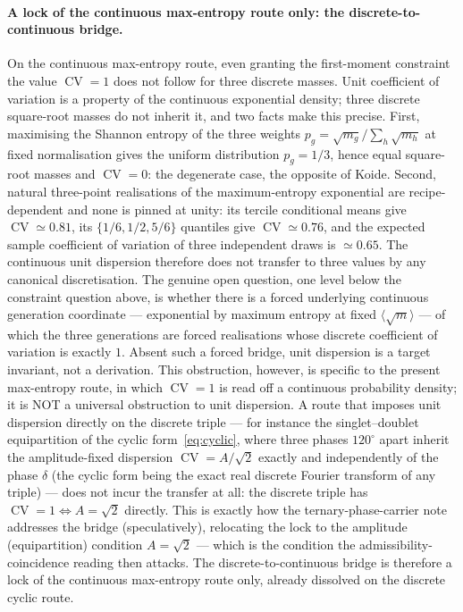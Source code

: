 \documentclass[11pt]{article}
\theoremstyle{definition}
\theoremstyle{remark}
\newcommand{\CV}{\operatorname{CV}}
\begin{document}
    \paragraph{A lock of the continuous max-entropy route only: the discrete-to-continuous bridge.}
    On the continuous max-entropy route, even granting the first-moment constraint the value $\CV = 1$ does not
    follow for three discrete masses.
    Unit coefficient of variation is a property of the continuous exponential density; three discrete square-root
    masses do not inherit it, and two facts make this precise.
    First, maximising the Shannon entropy of the three weights $p_g = \sqrt{m_g} / \sum_h \sqrt{m_h}$ at fixed
    normalisation gives the uniform distribution $p_g = 1/3$, hence equal square-root masses and $\CV = 0$: the
    degenerate case, the opposite of Koide.
    Second, natural three-point realisations of the maximum-entropy exponential are recipe-dependent and none is
    pinned at unity: its tercile conditional means give $\CV \simeq 0.81$, its $\{1/6, 1/2, 5/6\}$ quantiles give
    $\CV \simeq 0.76$, and the expected sample coefficient of variation of three independent draws is
    $\simeq 0.65$.
    The continuous unit dispersion therefore does not transfer to three values by any canonical discretisation.
    The genuine open question, one level below the constraint question above, is whether there is a forced
    underlying continuous generation coordinate --- exponential by maximum entropy at fixed
    $\langle \sqrt m \rangle$ --- of which the three generations are forced realisations whose discrete coefficient
    of variation is exactly $1$.
    Absent such a forced bridge, unit dispersion is a target invariant, not a derivation.
    This obstruction, however, is specific to the present max-entropy route, in which $\CV = 1$ is read off a
    continuous probability density; it is NOT a universal obstruction to unit dispersion.
    A route that imposes unit dispersion directly on the discrete triple --- for instance the singlet--doublet
    equipartition of the cyclic form~\eqref{eq:cyclic}, where three phases $120^\circ$ apart inherit the
    amplitude-fixed dispersion $\CV = A/\sqrt2$ exactly and independently of the phase $\delta$ (the cyclic form
    being the exact real discrete Fourier transform of any triple) --- does not incur the transfer at all: the
    discrete triple has $\CV = 1 \iff A = \sqrt2$ directly.
    This is exactly how the ternary-phase-carrier note~\cite{Beau2026tpc} addresses the bridge (speculatively),
    relocating the lock to the amplitude (equipartition) condition $A = \sqrt2$ --- which is the condition the
    admissibility-coincidence reading then attacks.
    The discrete-to-continuous bridge is therefore a lock of the continuous max-entropy route only, already
    dissolved on the discrete cyclic route.
\end{document}
